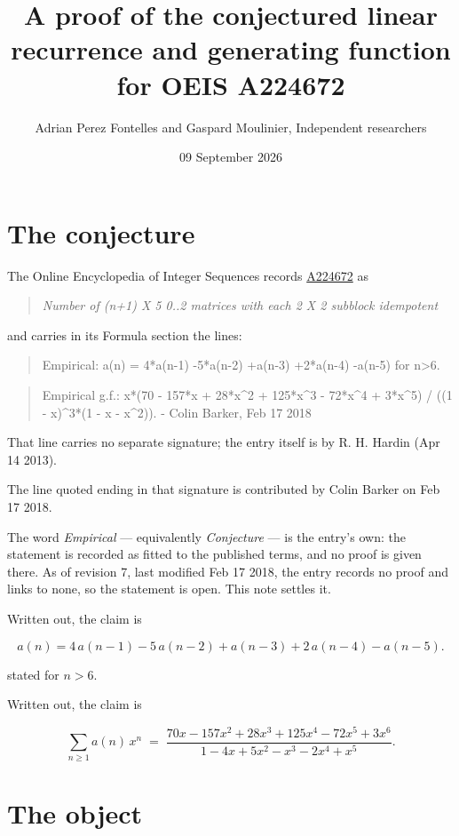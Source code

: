 \documentclass[11pt]{article}
\title{A proof of the conjectured linear recurrence and generating function for OEIS A224672}
\author{Adrian Perez Fontelles and Gaspard Moulinier, Independent researchers}
\date{09 September 2026}
\theoremstyle{definition}
\begin{document}
\maketitle
\section{The conjecture}

The Online Encyclopedia of Integer Sequences records \href{https://oeis.org/A224672}{A224672} as

\begin{quote}\itshape Number of (n+1) X 5 0..2 matrices with each 2 X 2 subblock idempotent\end{quote}

and carries in its Formula section the lines:

\begin{quote}\ttfamily Empirical: a(n) = 4*a(n-1) -5*a(n-2) +a(n-3) +2*a(n-4) -a(n-5) for n>6.\end{quote}

\begin{quote}\ttfamily Empirical g.f.: x*(70 - 157*x + 28*x\textasciicircum{}2 + 125*x\textasciicircum{}3 - 72*x\textasciicircum{}4 + 3*x\textasciicircum{}5) / ((1 - x)\textasciicircum{}3*(1 - x - x\textasciicircum{}2)). - Colin Barker, Feb 17 2018\end{quote}

That line carries no separate signature; the entry itself is by R. H. Hardin (Apr 14 2013).

The line quoted ending in that signature is contributed by Colin Barker on Feb 17 2018.

The word {\itshape Empirical} --- equivalently {\itshape Conjecture} --- is the entry's own: the statement is recorded as fitted to the published terms, and no proof is given there. As of revision 7, last modified Feb 17 2018, the entry records no proof and links to none, so the statement is open. This note settles it.

Written out, the claim is

\[a(n) = 4\,a(n-1) - 5\,a(n-2) + a(n-3) + 2\,a(n-4) - a(n-5).\]

stated for $n > 6$.

Written out, the claim is

\[\sum_{n \ge 1} a(n)\,x^n \;=\; \frac{70x - 157x^{2} + 28x^{3} + 125x^{4} - 72x^{5} + 3x^{6}}{1 - 4x + 5x^{2} - x^{3} - 2x^{4} + x^{5}}.\]

\section{The object}
\end{document}

